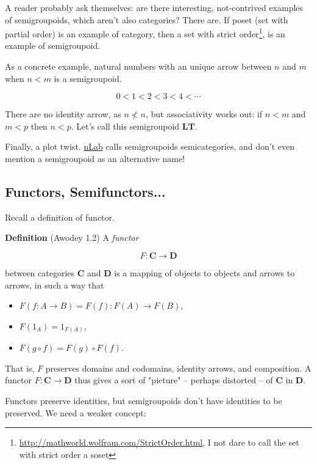 \documentclass{article}
\begin{document}
A reader probably ask themselves: are there interesting, not-contrived
examples of semigroupoids, which aren't also categories?
There are. If poset (set with partial order) is 
an example of category, then a set with strict order\footnote{\url{http://mathworld.wolfram.com/StrictOrder.html}, I not dare to call the set with strict order a soset},
is an example of semigroupoid.

As a concrete example, natural numbers with an unique arrow between $n$ and $m$ when $n < m$ is a semigroupoid.

\begin{equation}
0 < 1 < 2 < 3 < 4 < \cdots
\end{equation}

There are no identity arrow, as $n \not< n$, but associativity works out:
if $n < m$ and $m < p$ then $n < p$. Let's call this semigroupoid $\mathbf{LT}$.

Finally, a plot twist. \href{https://ncatlab.org/nlab/show/semicategory}{nLab} calls semigroupoids semicategories,
and don't even mention a semigroupoid as an alternative name!

\subsection{Functors, Semifunctors...}

Recall a definition of functor.

\textbf{Definition} (Awodey 1.2)
A \emph{functor}

\begin{equation*}
F : \mathbf{C} \to \mathbf{D}
\end{equation*}

between categories $\mathbf{C}$ and $\mathbf{D}$ is a mapping of objects
to objects and arrows to arrows, in such a way that
\begin{itemize}
\item $F (f : A \to B) = F(f) : F(A) \to F(B)$,
\item $F(1_A) = 1_{F(A)}$,
\item $F(g \circ f) = F(g) \circ F(f)$.
\end{itemize}
That is, $F$ preserves domains and codomains, identity arrows,
and composition. A functor $F : \mathbf{C} \to \mathbf{D}$ thus gives
a sort of "picture" -- perhaps distorted -- of $\mathbf{C}$ in $\mathbf{D}$.

Functors preserve identities, but semigroupoids don't have identities to be preserved.
We need a weaker concept:
\end{document}
